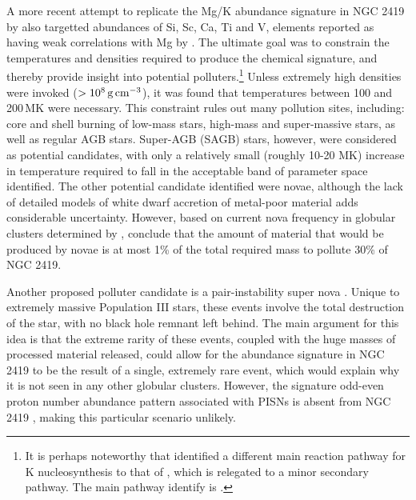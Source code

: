 \documentclass[a4paper,fleqn,usenatbib]{mnras}
\begin{document}
A more recent attempt to replicate the Mg/K abundance signature in NGC 2419 by \cite{iliadis2016} also targetted abundances of Si, Sc, Ca, Ti and V, elements reported as having weak correlations with Mg by \cite{cohenkirby2012}. The ultimate goal was to constrain the temperatures and densities required to produce the chemical signature, and thereby provide insight into potential polluters.\footnote{It is perhaps noteworthy that \cite{iliadis2016} identified a different main reaction pathway for K nucleosynthesis to that of \cite{ventura2012}, which is relegated to a minor secondary pathway. The main pathway \cite{iliadis2016} identify is .}
Unless extremely high densities were invoked ($>10^8\,{\rm g\,cm}^{-3}$), it was found that temperatures between 100 and 200\,MK were necessary. This constraint rules out many pollution sites, including: core and shell burning of low-mass stars, high-mass and super-massive stars, as well as regular AGB stars. Super-AGB (SAGB) stars, however, were considered as potential candidates, with only a relatively small (roughly 10-20 MK) increase in temperature required to fall in the acceptable band of parameter space identified. The other potential candidate identified were novae, although the lack of detailed models of white dwarf accretion of metal-poor material adds considerable uncertainty. However, based on current nova frequency in globular clusters determined by \cite{kato2013novae}, \cite{iliadis2016} conclude that the amount of material that would be produced by novae is at most 1\% of the total required mass to pollute 30\% of NGC 2419.

Another proposed  polluter candidate is a pair-instability super nova \citep[PISN;][]{carretta2013}. Unique to extremely massive Population III stars, these events involve the total destruction of the star, with no black hole remnant left behind. The main argument for this idea is that the extreme rarity of these events, coupled with the huge masses of processed material released, could allow for the abundance signature in NGC 2419 to be the result of a single, extremely rare event, which would explain why it is not seen in any other globular clusters. However, the signature odd-even proton number abundance pattern associated with PISNs is absent from NGC 2419 \citep{cohenkirby2012}, making this particular scenario unlikely.

\end{document}
